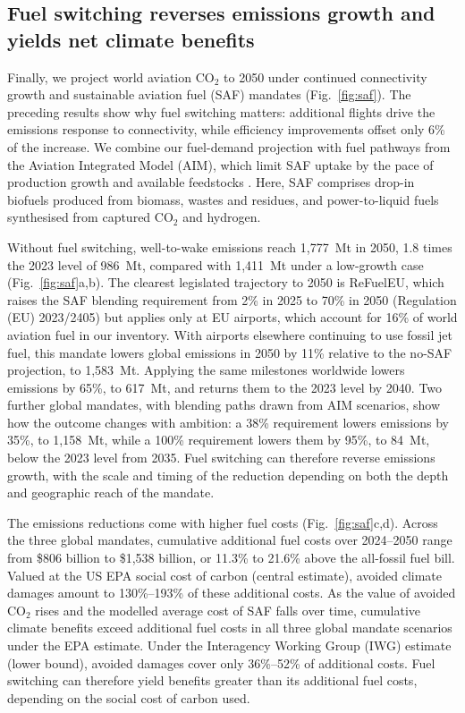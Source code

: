 \documentclass[12pt]{extarticle}
\begin{document}
\subsection*{Fuel switching reverses emissions growth and yields net climate benefits}
Finally, we project world aviation CO$_2$ to 2050 under continued connectivity growth and sustainable aviation fuel (SAF) mandates (Fig.~\ref{fig:saf}). The preceding results show why fuel switching matters: additional flights drive the emissions response to connectivity, while efficiency improvements offset only 6\% of the increase. We combine our fuel-demand projection with fuel pathways from the Aviation Integrated Model (AIM), which limit SAF uptake by the pace of production growth and available feedstocks \citep{dray2019aim2015,dray2022}. Here, SAF comprises drop-in biofuels produced from biomass, wastes and residues, and power-to-liquid fuels synthesised from captured CO$_2$ and hydrogen.

Without fuel switching, well-to-wake emissions reach 1,777~Mt in 2050, 1.8 times the 2023 level of 986~Mt, compared with 1,411~Mt under a low-growth case (Fig.~\ref{fig:saf}a,b). The clearest legislated trajectory to 2050 is ReFuelEU, which raises the SAF blending requirement from 2\% in 2025 to 70\% in 2050 (Regulation (EU) 2023/2405) but applies only at EU airports, which account for 16\% of world aviation fuel in our inventory. With airports elsewhere continuing to use fossil jet fuel, this mandate lowers global emissions in 2050 by 11\% relative to the no-SAF projection, to 1,583~Mt. Applying the same milestones worldwide lowers emissions by 65\%, to 617~Mt, and returns them to the 2023 level by 2040. Two further global mandates, with blending paths drawn from AIM scenarios, show how the outcome changes with ambition: a 38\% requirement lowers emissions by 35\%, to 1,158~Mt, while a 100\% requirement lowers them by 95\%, to 84~Mt, below the 2023 level from 2035. Fuel switching can therefore reverse emissions growth, with the scale and timing of the reduction depending on both the depth and geographic reach of the mandate.

The emissions reductions come with higher fuel costs (Fig.~\ref{fig:saf}c,d). Across the three global mandates, cumulative additional fuel costs over 2024--2050 range from \$806 billion to \$1,538 billion, or 11.3\% to 21.6\% above the all-fossil fuel bill. Valued at the US EPA social cost of carbon (central estimate), avoided climate damages amount to 130\%--193\% of these additional costs. As the value of avoided CO$_2$ rises and the modelled average cost of SAF falls over time, cumulative climate benefits exceed additional fuel costs in all three global mandate scenarios under the EPA estimate. Under the Interagency Working Group (IWG) estimate (lower bound), avoided damages cover only 36\%--52\% of additional costs. Fuel switching can therefore yield benefits greater than its additional fuel costs, depending on the social cost of carbon used.
\end{document}
